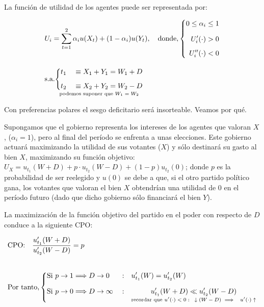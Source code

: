 \documentclass[10pt,a4paper]{article}
\begin{document}
La función de utilidad de los agentes puede ser representada por: 

$$\begin{aligned}
    &U_i=\sum_{t=1}^2\alpha_iu(X_t)+(1-\alpha_i)u(Y_t),\quad \text{donde,}
    \left\{\begin{aligned} 
        0\leq \alpha_i \leq 1\\[0.7em]
        U'_i(\cdot)>0 \\[0.5em]
        U''_i(\cdot)<0
    \end{aligned}\right.\\[1em]
    &\text{s.a.}
    \underset{\text{\scriptsize podemos suponer que $W_1=W_2$}}{\left\{\begin{aligned}
        &t_1&&\equiv X_1+Y_1=W_1+D\\[0.5em]
        &t_2&&\equiv X_2+Y_2=W_2-D
    \end{aligned}\right.}
\end{aligned}$$

Con preferencias polares el sesgo deficitario será insorteable. Veamos por qué.

Supongamos que el gobierno representa los intereses de los agentes que valoran $X$, ($\alpha_i=1$), pero al final del período se enfrenta a unas elecciones. Este gobierno actuará maximizando la utilidad de sus votantes ($X$) y sólo destinará su gasto al bien $X$, maximizando su función objetivo: $U_X=u_{t_1}(W+D)+ p \cdot u_{t_2}(W-D)+ (1-p)u_{t_2}(0)$; donde $p$ es la probabilidad de ser reelegido y $u(0)$ se debe a que, si el otro partido político gana, los votantes que valoran el bien $X$ obtendrían una utilidad de $0$ en el período futuro (dado que dicho gobierno sólo financiará el bien $Y$). 

La maximización de la función objetivo del partido en el poder con respecto de $D$ conduce a la siguiente CPO:

$$\begin{aligned}
    &\text{CPO:}\quad \frac{u_{t_1}'(W+D)}{u_{t_2}'(W-D)}=p\\[2em]
    &\text{Por tanto,}\left\{\begin{aligned}
        &\text{Si $p\to1$}\Longrightarrow D\to0&&: &&u'_{t_1}(W)=u'_{t_2}(W) \\[0.7em]
        &\text{Si $p\to0$}\Longrightarrow D\to\infty&&: &&\underset{\text{\scriptsize recordar que $u'(\cdot) <0:\;\;\;\downarrow(W-D)\;\Longrightarrow\;\;\;u'(\cdot)\uparrow$}}{u'_{t_1}(W+D)\ll u'_{t_2}(W-D)}
    \end{aligned}\right.
\end{aligned}$$
\end{document}
